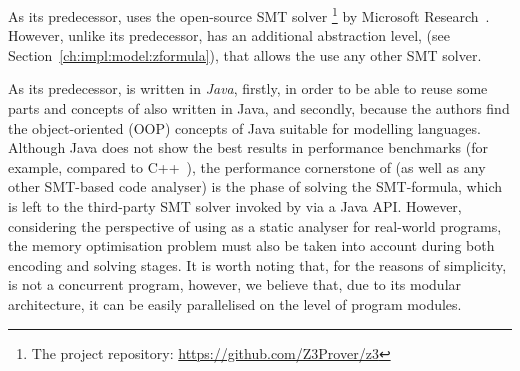 As its predecessor, \porthos[2] uses the open-source SMT solver %
%
\footnote{The  project repository: \url{https://github.com/Z3Prover/z3}} %
%
by Microsoft Research~\cite{de2008z3}. However, unlike its predecessor, \porthos[2] has an additional abstraction level, \zformula{} (see Section~\ref{ch:impl:model:zformula}), that allows the use any other SMT solver.

As its predecessor, \porthos[2] is written in \textit{Java},
firstly, in order to be able to reuse some parts and concepts of \porthos{} also written in Java, and secondly, because the authors find the object-oriented (OOP) concepts of Java suitable for modelling languages.
Although Java does not show the best results in performance benchmarks (for example, compared to C++~\cite{hundt2011loop}), the performance cornerstone of \porthos[2] (as well as any other SMT-based code analyser) is the phase of solving the SMT-formula, which is left to the third-party SMT solver invoked by \porthos[2] via a Java API.
However, considering the perspective of using \porthos[2] as a static analyser for real-world programs, the memory optimisation problem must also be taken into account during both encoding and solving stages.
It is worth noting that, for the reasons of simplicity, \porthos[2] is not a concurrent program, however, we believe that, due to its modular architecture, it can be easily parallelised on the level of program modules.


